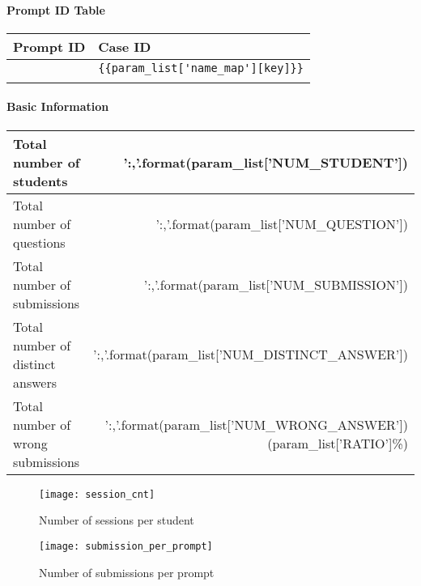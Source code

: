 \documentclass[12pt]{article} %
\begin{document}
\setlength{\pdfpageheight}{\paperheight}
\setlength{\pdfpagewidth}{\paperwidth}
\setlength{\parindent}{0pt} %
\setlength{\parskip}{2ex} %

\paragraph{Prompt ID Table}
\begin{center}
	\begin{tabular}{ll}
		Prompt ID & Case ID \\\toprule
		{%
		{{key}} & \verb|{{param_list['name_map'][key]}}| \\\midrule
		{%
	\end{tabular}
\end{center}

\paragraph{Basic Information}
\begin{center}
	\begin{tabular}{lr}
		\toprule
		Total number of students & {{'{:,}'.format(param_list['NUM_STUDENT'])}} \\\midrule
		Total number of questions & {{'{:,}'.format(param_list['NUM_QUESTION'])}} \\\midrule
		Total number of submissions & {{'{:,}'.format(param_list['NUM_SUBMISSION'])}} \\\midrule
		Total number of distinct answers & {{'{:,}'.format(param_list['NUM_DISTINCT_ANSWER'])}} \\\midrule
		Total number of wrong submissions & {{'{:,}'.format(param_list['NUM_WRONG_ANSWER'])}} ({{param_list['RATIO']}}\%) \\\bottomrule
	\end{tabular}
\end{center}

\begin{figure}[!ht]
	\centering
	\texttt{[image: session\_cnt]}
	\caption{Number of sessions per student}
\end{figure}

\begin{figure}[!ht]
	\centering
	\texttt{[image: submission\_per\_prompt]}
	\caption{Number of submissions per prompt}
\end{figure}
\end{document}
